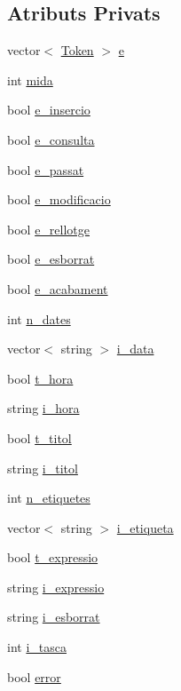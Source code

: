 \subsection*{Atributs Privats}
\begin{DoxyCompactItemize}
\item 
vector$<$ \hyperlink{class_token}{Token} $>$ \hyperlink{class_comanda_a4792137ffe62e366d017c085798e1de7}{e}
\item 
int \hyperlink{class_comanda_abaf613f247586557027ad5857ace89c2}{mida}
\item 
bool \hyperlink{class_comanda_afa50474d0c9c08da1f3042cfddc9df24}{e\+\_\+insercio}
\item 
bool \hyperlink{class_comanda_a558a2944c2306c12df9f889fc96a58dd}{e\+\_\+consulta}
\item 
bool \hyperlink{class_comanda_a38e7cdf2003076cbe88461f03dc2106c}{e\+\_\+passat}
\item 
bool \hyperlink{class_comanda_a96d917429f6bfa73608d745ad1e1dfc7}{e\+\_\+modificacio}
\item 
bool \hyperlink{class_comanda_ad73910246f9c47c887a3c01b53350282}{e\+\_\+rellotge}
\item 
bool \hyperlink{class_comanda_a70a9790e90a45015dbcd4c6700ec0812}{e\+\_\+esborrat}
\item 
bool \hyperlink{class_comanda_a0f7472af37d7f6c24f74fbac60e4a696}{e\+\_\+acabament}
\item 
int \hyperlink{class_comanda_a0a4e13d8edba10c69d1b058d8fc6a7c3}{n\+\_\+dates}
\item 
vector$<$ string $>$ \hyperlink{class_comanda_a06ee1d3173ee0ae52c588689e9263099}{i\+\_\+data}
\item 
bool \hyperlink{class_comanda_ae481194a2016e940e655173e897d214d}{t\+\_\+hora}
\item 
string \hyperlink{class_comanda_a480a34460b3668a5b4a1fa7e796632db}{i\+\_\+hora}
\item 
bool \hyperlink{class_comanda_a08e8674396e2125cf8b2900f289713a7}{t\+\_\+titol}
\item 
string \hyperlink{class_comanda_aca04e90eab5ac14ddc3b25f154aabe48}{i\+\_\+titol}
\item 
int \hyperlink{class_comanda_a1e525815f0745140e05da2ebb96ec39a}{n\+\_\+etiquetes}
\item 
vector$<$ string $>$ \hyperlink{class_comanda_a1d193f66ea6d2681ab79a16192da3114}{i\+\_\+etiqueta}
\item 
bool \hyperlink{class_comanda_ac7037525fc1cd9f49b02bd87cf4b6123}{t\+\_\+expressio}
\item 
string \hyperlink{class_comanda_a9236cdc5142b6a9f4116673abce06508}{i\+\_\+expressio}
\item 
string \hyperlink{class_comanda_a269a43d5b283a23792791a2ba67747b0}{i\+\_\+esborrat}
\item 
int \hyperlink{class_comanda_aab152fe48a937f449c027a2274fc31e7}{i\+\_\+tasca}
\item 
bool \hyperlink{class_comanda_a9a1bf4bf74940a4bac90140e67d11972}{error}
\end{DoxyCompactItemize}
